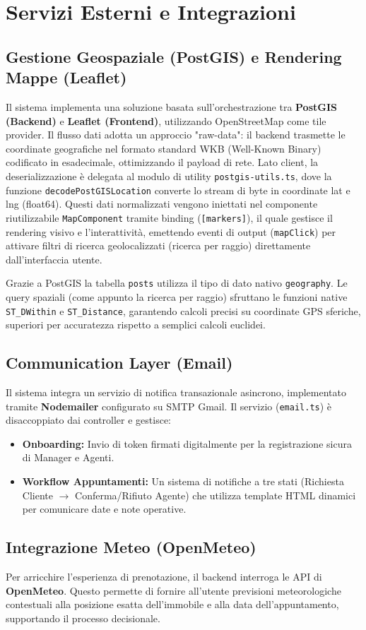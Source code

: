 \section{Servizi Esterni e Integrazioni}

\subsection{Gestione Geospaziale (PostGIS) e Rendering Mappe (Leaflet)}
Il sistema implementa una soluzione basata sull'orchestrazione tra \textbf{PostGIS (Backend)} e \textbf{Leaflet (Frontend)}, 
utilizzando OpenStreetMap come tile provider. Il flusso dati adotta un approccio "raw-data": 
il backend trasmette le coordinate geografiche nel formato standard WKB (Well-Known Binary) codificato in esadecimale, 
ottimizzando il payload di rete. Lato client, la deserializzazione è delegata al modulo di utility \texttt{postgis-utils.ts}, 
dove la funzione \texttt{decodePostGISLocation} converte lo stream di byte in coordinate lat e lng (float64). 
Questi dati normalizzati vengono iniettati nel componente riutilizzabile \texttt{MapComponent} 
tramite binding (\texttt{[markers]}), il quale gestisce il rendering visivo e l'interattività, emettendo eventi di 
output (\texttt{mapClick}) per attivare filtri di ricerca geolocalizzati (ricerca per raggio) direttamente dall'interfaccia utente.

Grazie a PostGIS la tabella \texttt{posts} utilizza il tipo di dato nativo \texttt{geography}. Le query spaziali (come appunto la ricerca per raggio) sfruttano le funzioni native \texttt{ST\_DWithin} e \texttt{ST\_Distance}, garantendo calcoli precisi su coordinate GPS sferiche, superiori per accuratezza rispetto a semplici calcoli euclidei.

\subsection{Communication Layer (Email)}
Il sistema integra un servizio di notifica transazionale asincrono, implementato tramite \textbf{Nodemailer} configurato su SMTP Gmail.
Il servizio (\texttt{email.ts}) è disaccoppiato dai controller e gestisce:
\begin{itemize}
    \item \textbf{Onboarding:} Invio di token firmati digitalmente per la registrazione sicura di Manager e Agenti.
    \item \textbf{Workflow Appuntamenti:} Un sistema di notifiche a tre stati (Richiesta Cliente $\rightarrow$ Conferma/Rifiuto Agente) che utilizza template HTML dinamici per comunicare date e note operative.
\end{itemize}

\subsection{Integrazione Meteo (OpenMeteo)}
Per arricchire l'esperienza di prenotazione, il backend interroga le API di \textbf{OpenMeteo}. Questo permette di fornire all'utente previsioni meteorologiche contestuali alla posizione esatta dell'immobile e alla data dell'appuntamento, supportando il processo decisionale.
